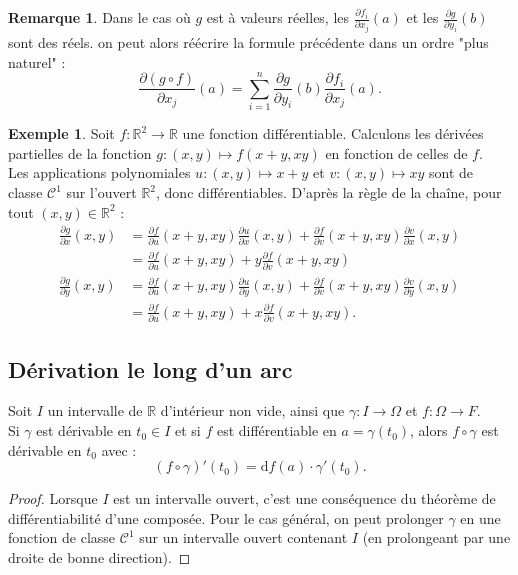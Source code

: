 \documentclass[french]{article}
\newcommand{\R}{\mathbb{R}}
\renewcommand{\d}{\text{d}}
\theoremstyle{plain}
\theoremstyle{definition}
\newtheorem*{ex}{Exemple}
\newtheorem*{rmq}{Remarque}
\theoremstyle{remark}
\begin{document}
\begin{rmq}
	Dans le cas où $g$ est à valeurs réelles, les $\displaystyle\frac{\partial f_i}{\partial x_j}(a)$ et les $\displaystyle\frac{\partial g}{\partial y_i}(b)$ sont des réels. on peut alors réécrire la formule précédente dans un ordre "plus naturel" :
	$$\frac{\partial (g\circ f)}{\partial x_j}(a)=\sum_{i=1}^{n}\frac{\partial g}{\partial y_i}(b)\frac{\partial f_i}{\partial x_j}(a).$$
\end{rmq}

\begin{ex}
	Soit $f:\R^2\to\R$ une fonction différentiable. Calculons les dérivées partielles de la fonction $g:(x,y)\mapsto f(x+y,xy)$ en fonction de celles de $f$.\\
	Les applications polynomiales $u:(x,y)\mapsto x+y$ et $v:(x,y)\mapsto xy$ sont de classe $\mathcal{C}^1$ sur l'ouvert $\R^2$, donc différentiables. D'après la règle de la chaîne, pour tout $(x,y)\in\R^2$ :
	\begin{align*}
		\frac{\partial g}{\partial x}(x,y)&=\frac{\partial f}{\partial u}(x+y,xy)\frac{\partial u}{\partial x}(x,y)+\frac{\partial f}{\partial v}(x+y,xy)\frac{\partial v}{\partial x}(x,y)\\[2mm]
		&=\frac{\partial f}{\partial u}(x+y,xy)+y\frac{\partial f}{\partial v}(x+y,xy)\\[2mm]
		\frac{\partial g}{\partial y}(x,y)&=\frac{\partial f}{\partial u}(x+y,xy)\frac{\partial u}{\partial y}(x,y)+\frac{\partial f}{\partial v}(x+y,xy)\frac{\partial v}{\partial y}(x,y)\\[2mm]
		&=\frac{\partial f}{\partial u}(x+y,xy)+x\frac{\partial f}{\partial v}(x+y,xy).
	\end{align*}
\end{ex}

\subsection{Dérivation le long d'un arc}

\begin{prop}%
	Soit $I$ un intervalle de $\R$ d'intérieur non vide, ainsi que $\gamma:I\to\Omega$ et $f:\Omega\to F$.\\
	Si $\gamma$ est dérivable en $t_0\in I$ et si $f$ est différentiable en $a=\gamma(t_0)$, alors $f\circ\gamma$ est dérivable en $t_0$ avec :
	$$(f\circ \gamma)'(t_0)=\d f(a)\cdot\gamma'(t_0).$$
\end{prop}

\begin{proof}
	Lorsque $I$ est un intervalle ouvert, c'est une conséquence du théorème de différentiabilité d'une composée. Pour le cas général, on peut prolonger $\gamma$ en une fonction de classe $\mathcal{C}^1$ sur un intervalle ouvert contenant $I$ (en prolongeant par une droite de bonne direction).
\end{proof}
\end{document}

